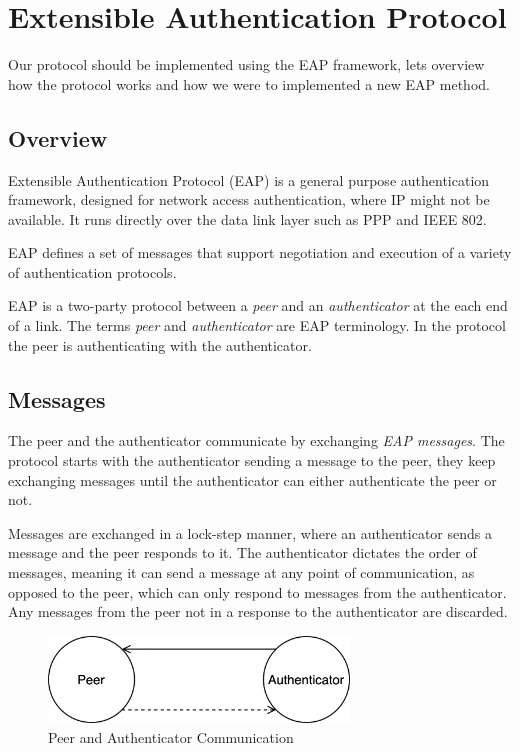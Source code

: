 \section{Extensible Authentication Protocol}
Our protocol should be implemented using the EAP framework, lets overview how the protocol works and how we were to implemented a new EAP method.



\subsection{Overview}
Extensible Authentication Protocol \cite{aboba2004extensible} (EAP) is a general purpose authentication framework, designed for network access authentication, where IP might not be available. 
It runs directly over the data link layer such as PPP  \cite{simpson1994rfc1661} and IEEE 802.

EAP defines a set of messages that support negotiation and execution of a variety of authentication protocols.

EAP is a two-party protocol between a \textit{peer} and an \textit{authenticator} at the each end of a link. The terms \textit{peer} and \textit{authenticator} are EAP terminology.
In the protocol the peer is authenticating with the authenticator.

\subsection{Messages}
The peer and the authenticator communicate by exchanging \textit{EAP messages}.
The protocol starts with the authenticator sending a message to the peer, they keep exchanging messages until the authenticator can either authenticate the peer or not.

Messages are exchanged in a lock-step manner, where an authenticator sends a message and the peer responds to it. 
The authenticator dictates the order of messages, meaning it can send a message at any point of communication, as opposed to the peer, which can only respond to messages from the authenticator.
Any messages from the peer not in a response to the authenticator are discarded.

\begin{figure}[h]
	\centering
	\includegraphics[width=8cm]{images/eap-messages}
	\caption{Peer and Authenticator Communication}
	\label{fig:eap-messages}
\end{figure}

